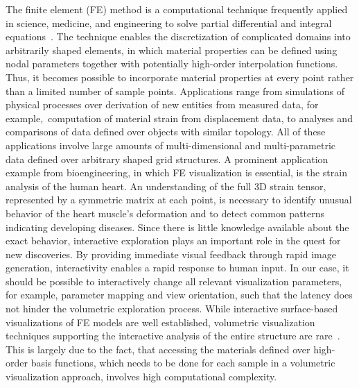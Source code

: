 \documentclass[journal]{vgtc}                %
\begin{document}
The finite element (FE) method is a computational technique frequently applied in science, medicine, and engineering to solve partial differential and integral equations~\cite{Young00}. The technique enables the discretization of complicated domains into arbitrarily shaped elements, in which material properties can be defined using nodal parameters together with potentially high-order interpolation functions. Thus, it becomes possible to incorporate material properties at every point rather than a limited number of sample points. Applications range from simulations of physical processes over derivation of new entities from measured data, for example,~computation of material strain from displacement data, to analyses and comparisons of data defined over objects with similar topology. All of these applications involve large amounts of multi-dimensional and multi-parametric data defined over arbitrary shaped grid structures. A prominent application example from bioengineering, in which FE visualization is essential, is the strain analysis of the human heart. An understanding of the full 3D strain tensor, represented by a symmetric matrix at each point, is necessary to identify unusual behavior of the heart muscle's deformation and to detect common patterns indicating developing diseases. Since there is little knowledge available about the exact behavior, interactive exploration plays an important role in the quest for new discoveries. By providing immediate visual feedback through rapid image generation, interactivity enables a rapid response to human input. In our case, it should be possible to interactively change all relevant visualization parameters, for example, parameter mapping and view orientation, such that the latency does not hinder the volumetric exploration process. While interactive surface-based visualizations of FE models are well established, volumetric visualization techniques supporting the interactive analysis of the entire structure are rare~\cite{Wihelms90}. This is largely due to the fact, that accessing the materials defined over high-order basis functions, which needs to be done for each sample in a volumetric visualization approach, involves high computational complexity.
\end{document}
